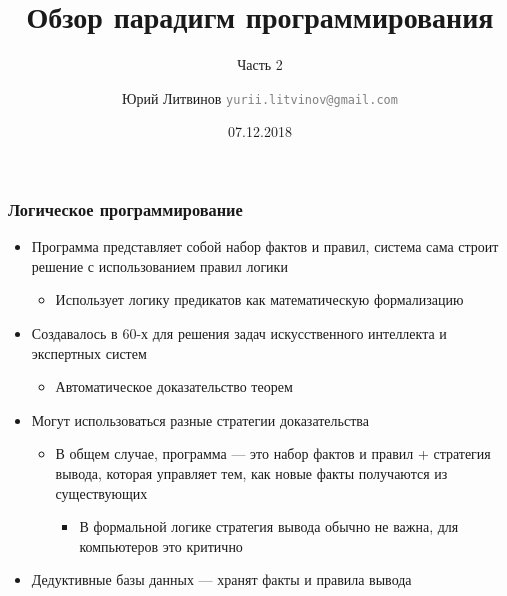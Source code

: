\documentclass[xetex,mathserif,serif]{beamer}
\title{Обзор парадигм программирования}
\subtitle{Часть 2}
\author[Юрий Литвинов]{Юрий Литвинов \newline \textcolor{gray}{\small\texttt{yurii.litvinov@gmail.com}}}
\date{07.12.2018}
\begin{document}
	
	\frame{\titlepage}

	\begin{frame}
		\frametitle{Логическое программирование}
		\begin{itemize}
			\item Программа представляет собой набор фактов и правил, система сама строит решение с использованием правил логики
			\begin{itemize}
				\item Использует логику предикатов как математическую формализацию
			\end{itemize}
			\item Создавалось в 60-х для решения задач искусственного интеллекта и экспертных систем
			\begin{itemize}
				\item Автоматическое доказательство теорем
			\end{itemize}
			\item Могут использоваться разные стратегии доказательства
			\begin{itemize}
				\item В общем случае, программа --- это набор фактов и правил + стратегия вывода, которая управляет тем, как новые факты получаются из существующих
				\begin{itemize}
					\item В формальной логике стратегия вывода обычно не важна, для компьютеров это критично
				\end{itemize}
			\end{itemize}
			\item Дедуктивные базы данных --- хранят факты и правила вывода
		\end{itemize}
	\end{frame}
\end{document}
